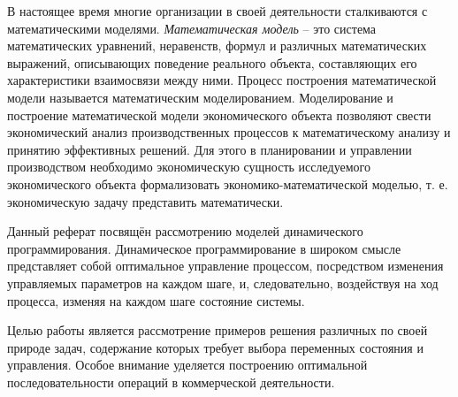 
В настоящее время многие организации в своей деятельности сталкиваются с математическими моделями. \textit{Математическая модель} – это система математических уравнений, неравенств, формул и различных математических выражений, описывающих поведение реального объекта, составляющих его характеристики взаимосвязи между ними. Процесс построения математической модели называется математическим моделированием. Моделирование и построение математической модели экономического объекта позволяют свести экономический анализ производственных процессов к математическому анализу и принятию эффективных решений. Для этого в планировании и управлении производством необходимо экономическую сущность исследуемого экономического объекта формализовать экономико-математической моделью, т. е. экономическую задачу представить математически.

Данный реферат посвящён рассмотрению моделей динамического программирования. Динамическое программирование в широком смысле представляет собой оптимальное управление процессом, посредством изменения управляемых параметров на каждом шаге, и, следовательно, воздействуя на ход процесса, изменяя на каждом шаге состояние системы.

Целью работы является рассмотрение примеров решения различных по своей природе задач, содержание которых требует выбора переменных состояния и управления. Особое внимание уделяется построению оптимальной последовательности операций в коммерческой деятельности.